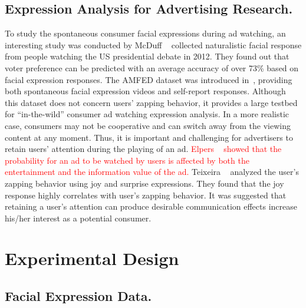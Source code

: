 \documentclass[twoside,leqno,twocolumn]{article}
\newcommand{\Songfan}[1]{\textcolor{red}{#1}}
\begin{document}
\subsection{Expression Analysis for Advertising Research.}

To study the spontaneous consumer facial expressions during ad watching, an interesting study was conducted by McDuff \etal~\cite{McDuff13} collected naturalistic facial response from people watching the US presidential debate in 2012. They found out that voter preference can be predicted with an average accuracy of over 73\% based on facial expression responses. The AMFED dataset was introduced in~\cite{amfed}, providing both spontaneous facial expression videos and self-report responses. Although this dataset does not concern users' zapping behavior, it provides a large testbed for ``in-the-wild'' consumer ad watching expression analysis. In a more realistic case, consumers may not be cooperative and can switch away from the viewing content at any moment. Thus, it is important and challenging for advertisers to retain users' attention during the playing of an ad. \Songfan{Elpers \etal~\cite{Elpers03} showed that the probability for an ad to be watched by users is affected by both the entertainment and the information value of the ad.} Teixeira \etal~\cite{Teixeira12} analyzed the user's zapping behavior using joy and surprise expressions. They found that the joy response highly correlates with user's zapping behavior. It was suggested that retaining a user's attention can produce desirable communication effects increase his/her interest as a potential consumer. 



\section{Experimental Design}

\subsection{Facial Expression Data.}
\end{document}
